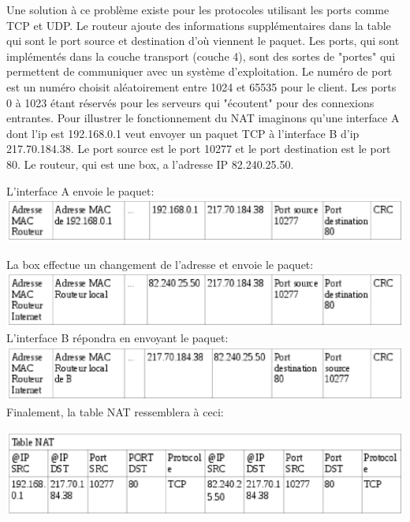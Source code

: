 Une solution à ce problème existe pour les protocoles utilisant les ports comme
TCP et UDP. Le routeur ajoute des informations supplémentaires dans la table qui
sont le port source et destination d'où viennent le paquet. Les ports, qui sont implémentés dans
la couche transport (couche 4), sont des sortes de "portes" qui permettent de
communiquer avec un système d'exploitation. Le numéro de port est un numéro
choisit aléatoirement entre 1024 et 65535 pour le client. Les ports 0 à 1023 étant réservés
pour les serveurs qui "écoutent" pour des connexions entrantes.
\newline
Pour illustrer le fonctionnement du NAT imaginons qu'une interface A dont l'ip
est 192.168.0.1 veut envoyer un paquet TCP à l'interface B d'ip 217.70.184.38.
Le port source est le port 10277 et le port destination est le port 80. Le
routeur, qui est une box, a l'adresse IP  82.240.25.50.

L'interface A envoie le paquet:
\includegraphics{./pics/PaquetAR.eps}

La box effectue un changement de l'adresse et envoie le paquet:
\includegraphics{./pics/PaquetRB.eps}
L'interface B répondra en envoyant le paquet:
\includegraphics{./pics/PaquetBR.eps}
\smallbreak
Finalement, la table NAT ressemblera à ceci:

\includegraphics{./pics/TableNAT1.eps}

